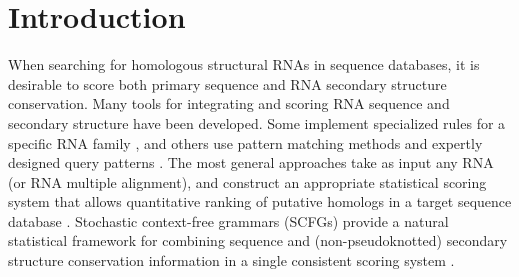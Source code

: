 \section{Introduction}

When searching for homologous structural RNAs in sequence databases,
it is desirable to score both primary sequence and RNA secondary
structure conservation. Many tools for integrating and scoring RNA
sequence and secondary structure have been developed. Some implement
specialized rules for a specific RNA family
\citep{LoweEddy97,Laslett04,LoweEddy99,Schattner06,Lai03,
Regalia02},
and others use pattern matching methods and expertly designed query
patterns \citep{Macke01}. The most general approaches take as input
any RNA (or RNA multiple alignment), and construct an appropriate
statistical scoring system that allows quantitative ranking of
putative homologs in a target sequence database
\citep{Gautheret01,ZhangBafna05,Huang08}.  Stochastic context-free
grammars (SCFGs) provide a natural statistical framework for combining
sequence and (non-pseudoknotted) secondary structure conservation
information in a single consistent scoring system
\citep{Sakakibara94c,Eddy94,Brown00,Durbin98}.




